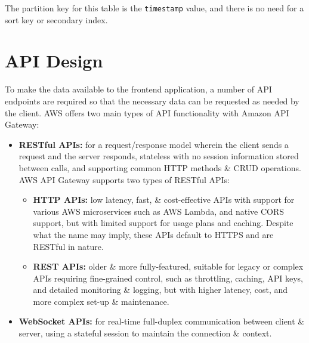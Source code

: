 \documentclass[a4paper,11pt]{report}
\begin{document}
The partition key for this table is the \verb|timestamp| value, and there is no need for a sort key or secondary index.

\section{API Design}
To make the data available to the frontend application, a number of API endpoints are required so that the necessary data can be requested as needed by the client.
AWS offers two main types of API functionality with Amazon API Gateway\supercite{awsapi}:
\begin{itemize}
    \item   \textbf{RESTful APIs:} for a request/response model wherein the client sends a request and the server responds, stateless with no session information stored between calls, and supporting common HTTP methods \& CRUD operations.
          AWS API Gateway supports two types of RESTful APIs\supercite{httpvsrest}:
          \begin{itemize}
              \item   \textbf{HTTP APIs:} low latency, fast, \& cost-effective APIs with support for various AWS microservices such as AWS Lambda, and native CORS support, but with limited support for usage plans and caching.
                      Despite what the name may imply, these APIs default to HTTPS and are RESTful in nature.
              \item   \textbf{REST APIs:} older \& more fully-featured, suitable for legacy or complex APIs requiring fine-grained control, such as throttling, caching, API keys, and detailed monitoring \& logging, but with higher latency, cost, and more complex set-up \& maintenance.
          \end{itemize}

    \item   \textbf{WebSocket APIs:} for real-time full-duplex communication between client \& server, using a stateful session to maintain the connection \& context.
\end{itemize}
\end{document}
